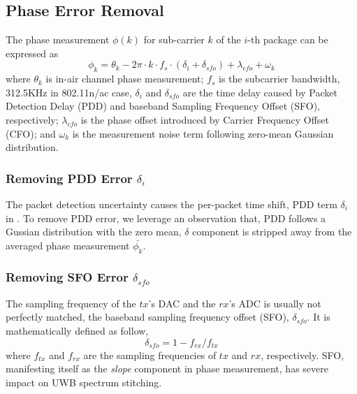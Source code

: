 
\subsection{Phase Error Removal} %
\label{sub:signal_model}

The phase measurement $\phi(k)$ for sub-carrier $k$ of the $i$-th package can be expressed as
\begin{equation}
\label{eq:phase_equation}
	\phi_k = \theta_k - 2\pi\cdot k\cdot f_s\cdot(\delta_i + \delta_{sfo}) + \lambda_{cfo} + \omega_k
\end{equation}
where $\theta_k$ is in-air channel phase measurement; $f_s$ is the subcarrier bandwidth, \ie 312.5KHz in 802.11n/ac case, $\delta_i$ and $\delta_{sfo}$ are the time delay caused by Packet Detection Delay (PDD) and baseband Sampling Frequency Offset (SFO), respectively; $\lambda_{cfo}$ is the phase offset introduced by Carrier Frequency Offset (CFO); and $\omega_k$ is the measurement noise term following zero-mean Gaussian distribution.


\subsubsection{Removing PDD Error $\delta_i$} %
\label{ssub:removing_pdd}
The packet detection uncertainty causes the per-packet time shift, \ie PDD term $\delta_i$ in . To remove PDD error, we leverage an observation that, PDD follows a Gussian distribution with the zero mean\cite{Speth1999Optimum}, \ie $\delta$ component is stripped away from the averaged phase measurement $\bar{\phi_k}$.

\subsubsection{Removing SFO Error $\delta_{sfo}$} %
\label{ssub:removing_sfo}

The sampling frequency of the $tx$'s DAC and the $rx$'s ADC is usually not perfectly matched, 
\ie the baseband sampling frequency offset (SFO), $\delta_{sfo}$. 
It is mathematically defined as follow,
\begin{equation}
\label{eq:sfo}
	\delta_{sfo} = 1 - f_{rx}/f_{tx}
\end{equation}
where $f_{tx}$ and $f_{rx}$ are the sampling frequencies of $tx$ and $rx$, respectively. 
SFO, manifesting itself as the \textit{slope} component in phase measurement, 
has severe impact on UWB spectrum stitching.
                                                                 

